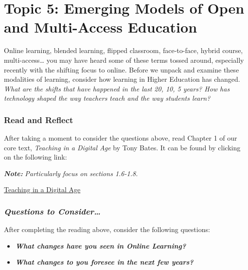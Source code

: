 \documentclass[
]{book}
\providecommand{\tightlist}{%
  \setlength{\itemsep}{0pt}\setlength{\parskip}{0pt}}
\begin{document}
\hypertarget{topic-5-emerging-models-of-open-and-multi-access-education}{%
\section*{Topic 5: Emerging Models of Open and Multi-Access Education}\label{topic-5-emerging-models-of-open-and-multi-access-education}}

Online learning, blended learning, flipped classroom, face-to-face, hybrid course, multi-access\ldots{} you may have heard some of these terms tossed around, especially recently with the shifting focus to online. Before we unpack and examine these modalities of learning, consider how learning in Higher Education has changed. \emph{What are the shifts that have happened in the last 20, 10, 5 years? How has technology shaped the way teachers teach and the way students learn?}

\begin{reflect}
\hypertarget{read-and-reflect-5}{%
\subsubsection*{Read and Reflect}\label{read-and-reflect-5}}

After taking a moment to consider the questions above, read Chapter 1 of our core text, \emph{Teaching in a Digital Age} by Tony Bates. It can be found by clicking on the following link:

\textbf{\emph{Note:}} \emph{Particularly focus on sections 1.6-1.8.}

\href{https://pressbooks.bccampus.ca/teachinginadigitalagev2/part/chapter-1-fundamental-change-in-education/}{Teaching in a Digital Age}

\hypertarget{questions-to-consider-3}{%
\subsubsection*{\texorpdfstring{\textbf{\emph{Questions to Consider\ldots{}}}}{Questions to Consider\ldots{}}}\label{questions-to-consider-3}}

After completing the reading above, consider the following questions:

\begin{itemize}
\tightlist
\item
  \textbf{\emph{What changes have you seen in Online Learning?}}\\
\item
  \textbf{\emph{What changes to you foresee in the next few years?}}
\end{itemize}
\end{reflect}
\end{document}
